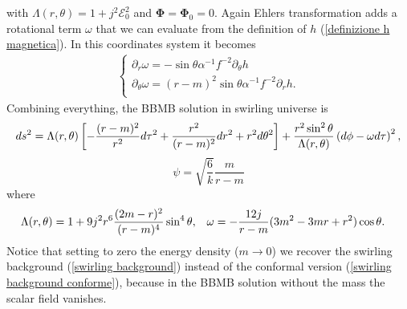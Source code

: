 with $\Lambda(r,\theta) = 1+j^2\mathcal{E}_0^2$ and $\boldsymbol{\Phi}=\boldsymbol{\Phi}_0=0$. Again Ehlers transformation adds a rotational term $\omega$ that we can evaluate from the definition of $h$ (\ref{definizione h magnetica}). In this coordinates system it becomes 
\begin{equation*}
    \begin{aligned}
        \begin{cases}
           \displaystyle\partial_r \omega = -\sin\theta \alpha^{-1}f^{-2}\partial_{\theta} h \\[0.7em]
           \displaystyle\partial_{\theta} \omega = (r-m)^2\sin\theta \alpha^{-1}f^{-2}\partial_{r} h .\\
        \end{cases}
    \end{aligned}
\end{equation*}
Combining everything, the BBMB solution in swirling universe is
\begin{equation}
    ds^2=\Lambda(r,\theta) \left[-\frac{(r-m)^2}{r^2}d\tau^2+ \frac{r^2}{(r-m)^2}dr^2+r^2d\theta^2 \right] + \frac{r^2\sin^2\theta}{\Lambda(r,\theta)}\left(d\phi -\omega d\tau \right)^2,
    \notag
\end{equation}
\begin{equation}
     \psi = \sqrt{\frac{6}{k}}\frac{m}{r-m}
        \label{BBMB magnetica + III)}
\end{equation}
where
\begin{align}
  \Lambda(r,\theta) & = 1+9j^2r^6\frac{(2m-r)^2}{(r-m)^4}\sin^4\theta, & \omega &= -\frac{12j}{r-m}(3m^2-3mr+r^2)\cos\theta .\notag
\end{align}
Notice that setting to zero the energy density ($m \rightarrow 0$) we recover the swirling background (\ref{swirling background}) instead of the conformal version (\ref{swirling background conforme}), because in the BBMB solution without the mass the scalar field vanishes.